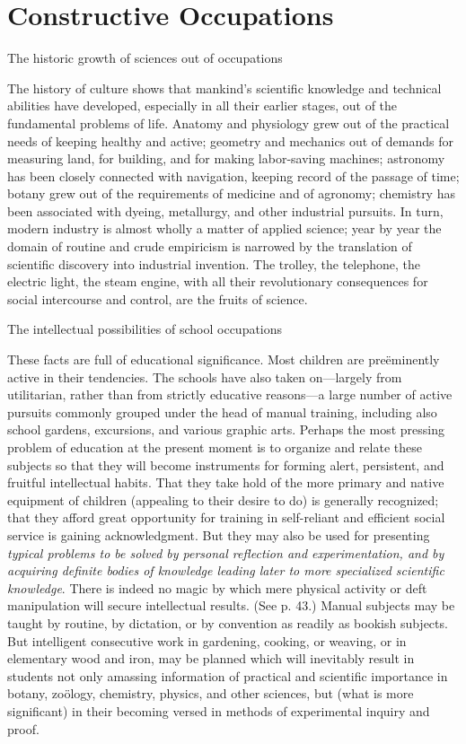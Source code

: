\documentclass[letterpaper]{book}
\begin{document}
\section{Constructive Occupations}

The historic growth of sciences out of occupations

The history of culture shows that mankind's scientific knowledge and
technical abilities have developed, especially in all their earlier
stages, out of the fundamental problems of life. Anatomy and physiology
grew out of the practical needs of keeping healthy and active; geometry
and mechanics out of demands for measuring land, for building, and for
making labor-saving machines; astronomy has been closely connected with
navigation, keeping record of the passage of time; botany grew
out
of the requirements of medicine and of agronomy; chemistry has been
associated with dyeing, metallurgy, and other industrial pursuits. In
turn, modern industry is almost wholly a matter of applied science; year
by year the domain of routine and crude empiricism is narrowed by the
translation of scientific discovery into industrial invention. The
trolley, the telephone, the electric light, the steam engine, with all
their revolutionary consequences for social intercourse and control, are
the fruits of science.

The intellectual possibilities of school occupations

These facts are full of educational significance. Most children are
preëminently active in their tendencies. The schools have also taken
on---largely from utilitarian, rather than from strictly educative
reasons---a large number of active pursuits commonly grouped under the
head of manual training, including also school gardens, excursions, and
various graphic arts. Perhaps the most pressing problem of education at
the present moment is to organize and relate these subjects so that they
will become instruments for forming alert, persistent, and fruitful
intellectual habits. That they take hold of the more primary and native
equipment of children (appealing to their desire to do) is generally
recognized; that they afford great opportunity for training in
self-reliant and efficient social service is gaining acknowledgment. But
they may also be used for presenting \emph{typical problems to be solved
by personal reflection and experimentation, and by acquiring definite
bodies of knowledge leading later to more specialized scientific
knowledge}. There is indeed no magic by which mere physical activity or
deft manipulation will secure intellectual results. (See p. 43.) Manual
subjects may be taught by routine, by dictation, or by convention as
readily
as bookish subjects. But intelligent consecutive work in gardening,
cooking, or weaving, or in elementary wood and iron, may be planned
which will inevitably result in students not only amassing information
of practical and scientific importance in botany, zoölogy, chemistry,
physics, and other sciences, but (what is more significant) in their
becoming versed in methods of experimental inquiry and proof.
\end{document}
